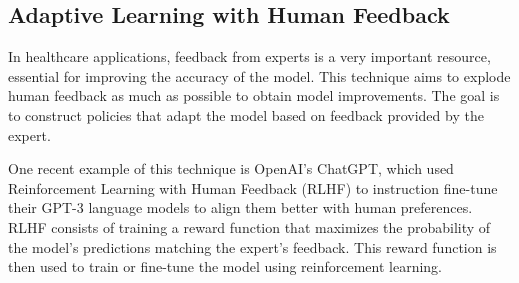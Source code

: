 \documentclass[../main.tex]{subfiles}
\begin{document}
    
    

    \subsection{Adaptive Learning with Human Feedback} \label{sec:human_feedback}

    In healthcare applications, feedback from experts is a very important resource, essential for improving the accuracy of the model. This technique aims to explode human feedback as much as possible to obtain model improvements. The goal is to construct policies that adapt the model based on feedback provided by the expert. 
    
    One recent example of this technique is OpenAI's ChatGPT, which used Reinforcement Learning with Human Feedback (RLHF) to instruction fine-tune their GPT-3 language models \cite{christiano_deep_2023,ouyang_training_2022} to align them better with human preferences. RLHF consists of training a reward function that maximizes the probability of the model's predictions matching the expert's feedback. This reward function is then used to train or fine-tune the model using reinforcement learning.



\end{document}
